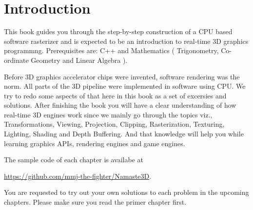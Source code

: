 \chapter{Introduction}
This book guides you through the step-by-step construction of a CPU based software rasterizer and is expected to be an introduction to real-time 3D graphics programmng. Prerequisites are: C++ and Mathematics ( Trigonometry, Co-ordinate Geometry and Linear Algebra ).  

Before 3D graphics accelerator chips were invented, software rendering was the norm. All parts of the 3D pipeline were implemented in software using CPU. We try to redo some aspects of that here in this book as a set of excersies and solutions. After finishing the book you will have a clear understanding of how real-time 3D engines work since we mainly go through the topics viz., Transformations, Viewing, Projection, Clipping, Rasterization, Texturing, Lighting, Shading and Depth Buffering. And that knowledge will help you while learning graphics APIs, rendering engines and game engines. 

The sample code of each chapter is availabe at 

\url{https://github.com/mmj-the-fighter/Namaste3D}. 

You are requested to try out your own solutions to each problem in the upcoming chapters. 
Please make sure  you read the primer chapter first.





\clearpage